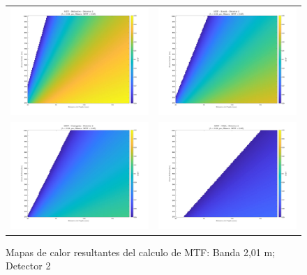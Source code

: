 \begin{landscape}
\begin{figure}[p]
\centering
\setlength{\tabcolsep}{2pt}
\renewcommand{\arraystretch}{0}

\begin{tabular}{cc}
\includegraphics[width=0.48\linewidth]{4.Payload/MTF/MTF_Lambda2_Detector2_Telescopio1_heatmap.jpg} &
\includegraphics[width=0.48\linewidth]{4.Payload/MTF/MTF_Lambda2_Detector2_Telescopio2_heatmap.jpg} \\
\includegraphics[width=0.48\linewidth]{4.Payload/MTF/MTF_Lambda2_Detector2_Telescopio3_heatmap.jpg} &
\includegraphics[width=0.48\linewidth]{4.Payload/MTF/MTF_Lambda2_Detector2_Telescopio4_heatmap.jpg} \\
\end{tabular}
\caption{Mapas de calor resultantes del calculo de MTF: Banda 2,01 \textmu m; Detector 2}
\end{figure}
\end{landscape}


